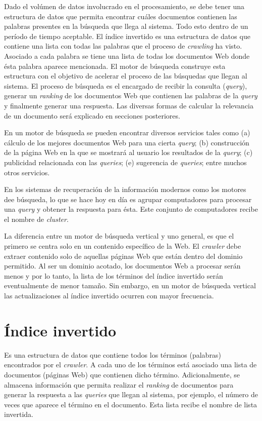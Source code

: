 Dado el volúmen de datos involucrado en el procesamiento, se debe tener una estructura de datos que permita encontrar cuáles documentos contienen las palabras presentes en la búsqueda que llega al sistema. Todo esto dentro de un período de tiempo aceptable. El índice invertido \citep{Zobel:2006} es una estructura de datos que contiene una lista con todas las palabras que el proceso de \textit{crawling} ha visto. Asociado a cada palabra se tiene una lista de todas los documentos Web donde ésta palabra aparece mencionada. El motor de búsqueda construye esta estructura con el objetivo de acelerar el proceso de las búsquedas que llegan al sistema. El proceso de búsqueda es el encargado de recibir la consulta (\textit{query}), generar un \textit{ranking} de los documentos Web que contienen las palabras de la \textit{query} y finalmente generar una respuesta. Las diversas formas de calcular la relevancia de un documento será explicado en secciones posteriores.

En un motor de búsqueda se pueden encontrar diversos servicios tales como (a) cálculo de los mejores documentos Web para una cierta \textit{query}; (b) construcción de la página Web en la que se mostrará al usuario los resultados de la \textit{query}; (c) publicidad relacionada con las \textit{queries}; (e) sugerencia de \textit{queries}; entre muchos otros servicios.

En los sistemas de recuperación de la información modernos como los motores dee búsqueda, lo que se hace hoy en día es agrupar computadores para procesar una \textit{query} y obtener la respuesta para ésta. Este conjunto de computadores recibe el nombre de \textit{cluster}.

La diferencia entre un motor de búsqueda vertical y uno general, es que el primero se centra solo en un contenido específico de la Web. El \textit{crawler} debe extraer contenido solo de aquellas páginas Web que están dentro del dominio permitido. Al ser un dominio acotado, los documentos Web a procesar serán menos y por lo tanto, la lista de los términos del índice invertido serán eventualmente de menor tamaño. Sin embargo, en un motor de búsqueda vertical las actualizaciones al índice invertido ocurren con mayor frecuencia.

\section{\'Indice invertido}
\label{marco:ii}
Es una estructura de datos que contiene todos los términos (palabras) encontrados por el \textit{crawler}. A cada uno de los términos está asociado una lista de documentos (páginas Web) que contienen dicho término. Adicionalmente, se almacena información que permita realizar el \textit{ranking} de documentos para generar la respuesta a las \textit{queries} que llegan al sistema, por ejemplo, el número de veces que aparece el término en el documento. Esta lista recibe el nombre de lista invertida.

